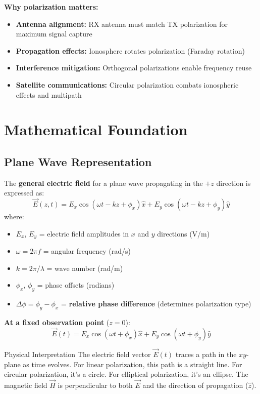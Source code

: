\textbf{Why polarization matters:}
\begin{itemize}
\item \textbf{Antenna alignment:} RX antenna must match TX polarization for maximum signal capture
\item \textbf{Propagation effects:} Ionosphere rotates polarization (Faraday rotation)
\item \textbf{Interference mitigation:} Orthogonal polarizations enable frequency reuse
\item \textbf{Satellite communications:} Circular polarization combats ionospheric effects and multipath
\end{itemize}

\section{Mathematical Foundation}

\subsection{Plane Wave Representation}

The \textbf{general electric field} for a plane wave propagating in the $+z$ direction is expressed as:
\begin{equation}
\vec{E}(z,t) = E_x \cos(\omega t - kz + \phi_x)\hat{x} + E_y \cos(\omega t - kz + \phi_y)\hat{y}
\label{eq:general-efield}
\end{equation}
where:
\begin{itemize}
\item $E_x$, $E_y$ = electric field amplitudes in $x$ and $y$ directions (V/m)
\item $\omega = 2\pi f$ = angular frequency (rad/s)
\item $k = 2\pi/\lambda$ = wave number (rad/m)
\item $\phi_x$, $\phi_y$ = phase offsets (radians)
\item $\Delta\phi = \phi_y - \phi_x$ = \textbf{relative phase difference} (determines polarization type)
\end{itemize}

\textbf{At a fixed observation point} ($z = 0$):
\begin{equation}
\vec{E}(t) = E_x \cos(\omega t + \phi_x)\hat{x} + E_y \cos(\omega t + \phi_y)\hat{y}
\label{eq:efield-fixed}
\end{equation}

\begin{calloutbox}{Physical Interpretation}
The electric field vector $\vec{E}(t)$ traces a path in the $xy$-plane as time evolves. For linear polarization, this path is a straight line. For circular polarization, it's a circle. For elliptical polarization, it's an ellipse. The magnetic field $\vec{H}$ is perpendicular to both $\vec{E}$ and the direction of propagation ($\hat{z}$).
\end{calloutbox}

